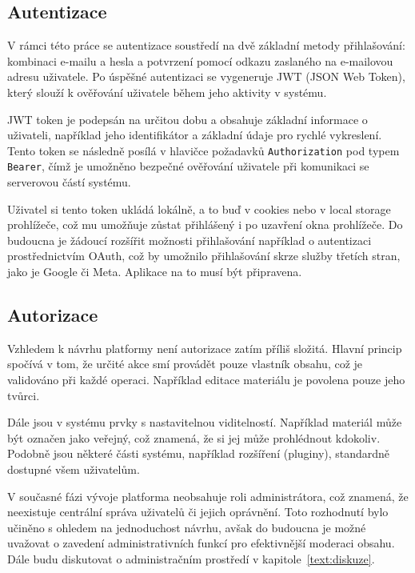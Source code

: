 \subsection{Autentizace}

V rámci této práce se autentizace soustředí na dvě základní metody přihlašování: kombinaci e-mailu a hesla a potvrzení pomocí odkazu zaslaného na e-mailovou adresu uživatele. 
Po úspěšné autentizaci se vygeneruje JWT (JSON Web Token), který slouží k ověřování uživatele během jeho aktivity v systému.

JWT token je podepsán na určitou dobu a obsahuje základní informace o uživateli, například jeho identifikátor a základní údaje pro rychlé vykreslení. 
Tento token se následně posílá v hlavičce požadavků \texttt{Authorization} pod typem \texttt{Bearer}, čímž je umožněno bezpečné ověřování uživatele při komunikaci se serverovou částí systému.

Uživatel si tento token ukládá lokálně, a to buď v cookies nebo v local storage prohlížeče, což mu umožňuje zůstat přihlášený i po uzavření okna prohlížeče. 
Do budoucna je žádoucí rozšířit možnosti přihlašování například o autentizaci prostřednictvím OAuth, což by umožnilo přihlašování skrze služby třetích stran, jako je Google či Meta.
Aplikace na to musí být připravena.

\subsection{Autorizace}

Vzhledem k návrhu platformy není autorizace zatím příliš složitá. 
Hlavní princip spočívá v tom, že určité akce smí provádět pouze vlastník obsahu, což je validováno při každé operaci.
Například editace materiálu je povolena pouze jeho tvůrci. 

Dále jsou v systému prvky s nastavitelnou viditelností. 
Například materiál může být označen jako veřejný, což znamená, že si jej může prohlédnout kdokoliv. 
Podobně jsou některé části systému, například rozšíření (pluginy), standardně dostupné všem uživatelům.

V současné fázi vývoje platforma neobsahuje roli administrátora, což znamená, že neexistuje centrální správa uživatelů či jejich oprávnění. 
Toto rozhodnutí bylo učiněno s ohledem na jednoduchost návrhu, avšak do budoucna je možné uvažovat o zavedení administrativních funkcí pro efektivnější moderaci obsahu.
Dále budu diskutovat o administračním prostředí v kapitole~\ref{text:diskuze}.